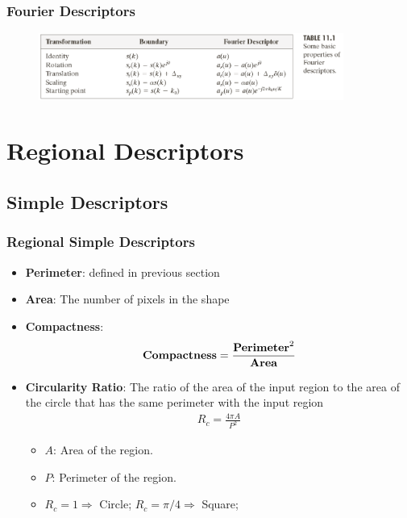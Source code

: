\documentclass[english,11pt,table,handout]{beamer}
\begin{document}
\frame
{
	\frametitle{Fourier Descriptors}
	
	\begin{figure}[!h]
		\includegraphics[width=10cm]{fourier2.png}
	\end{figure}
}
\section{Regional Descriptors}
\subsection{Simple Descriptors}
\frame
{
	\frametitle{Regional Simple Descriptors}
	\large
	\begin{itemize}
		\item \textbf{Perimeter}: defined in previous section
		\item \textbf{Area}: The number of pixels in the shape
		\item \textbf{Compactness}: 
		\begin{equation}
			\begin{split}
			\nonumber
			 \text{\textbf{Compactness}} = \frac{\text{\textbf{Perimeter}}^2}{\text{\textbf{Area}}}
			\end{split}
		\end{equation}
		\item \textbf{Circularity Ratio}: The ratio of the area of the input region to the area of the circle that has the same perimeter with the input region
		\begin{equation}
		\begin{split}
		\nonumber
			R_c = \frac{4 \pi A}{P^2}
		\end{split}
		\end{equation}
		\begin{itemize}
			\item $A$: Area of the region.
			\item $P$: Perimeter of the region.
			\item $R_c = 1 \Rightarrow$ Circle;  $R_c = \pi/4 \Rightarrow$ Square;  
		\end{itemize}
	\end{itemize}
	
}
\end{document}
